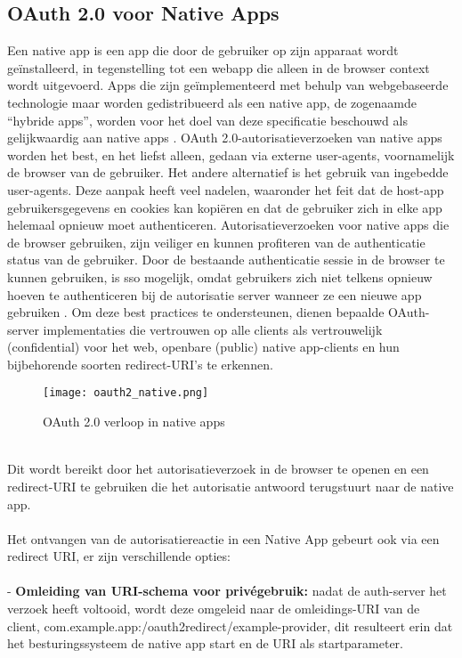   \subsection{OAuth 2.0 voor Native Apps}%
  \label{subsec:oauth-2.0-voor-native-apps}
  Een native app is een app die door de gebruiker op zijn apparaat wordt geïnstalleerd, in tegenstelling tot een webapp die alleen in de browser context wordt uitgevoerd. Apps die zijn geïmplementeerd met behulp van webgebaseerde technologie maar worden gedistribueerd als een native app, de zogenaamde ``hybride apps'', worden voor het doel van deze specificatie beschouwd als gelijkwaardig aan native apps \autocite{Denniss2017}.
  OAuth 2.0-autorisatieverzoeken van native apps worden het best, en het liefst alleen, gedaan via externe user-agents, voornamelijk de browser van de gebruiker. Het andere alternatief is het gebruik van ingebedde user-agents. Deze aanpak heeft veel nadelen, waaronder het feit dat de host-app gebruikersgegevens en cookies kan kopiëren en dat de gebruiker zich in elke app helemaal opnieuw moet authenticeren. Autorisatieverzoeken voor native apps die de browser gebruiken, zijn veiliger en kunnen profiteren van de authenticatie status van de gebruiker. Door de bestaande authenticatie sessie in de browser te kunnen gebruiken, is \gls{sso} mogelijk, omdat gebruikers zich niet telkens opnieuw hoeven te authenticeren bij de autorisatie server wanneer ze een nieuwe app gebruiken \autocite{Denniss2017}.
  Om deze best practices te ondersteunen, dienen bepaalde OAuth-server implementaties die vertrouwen op alle clients als vertrouwelijk (confidential) voor het web, openbare (public) native app-clients en hun bijbehorende soorten redirect-URI's te erkennen.
  \begin{figure}[h]
    \centering
    \texttt{[image: oauth2\_native.png]}
    \caption{OAuth 2.0 verloop in native apps}
    \label{fig:example2}
  \end{figure}
  \\
  Dit wordt bereikt door het autorisatieverzoek in de browser te openen en een redirect-URI te gebruiken die het autorisatie antwoord terugstuurt naar de native app.
  \\
  \\
  Het ontvangen van de autorisatiereactie in een Native App gebeurt ook via een redirect URI, er zijn verschillende opties:
  \\\\
  - \textbf{Omleiding van URI-schema voor privégebruik:} nadat de \gls{auth}-server het verzoek heeft voltooid, wordt deze omgeleid naar de omleidings-URI van de client, com.example.app:/oauth2redirect/example-provider, dit resulteert erin dat het besturingssysteem de native app start en de URI als startparameter.
